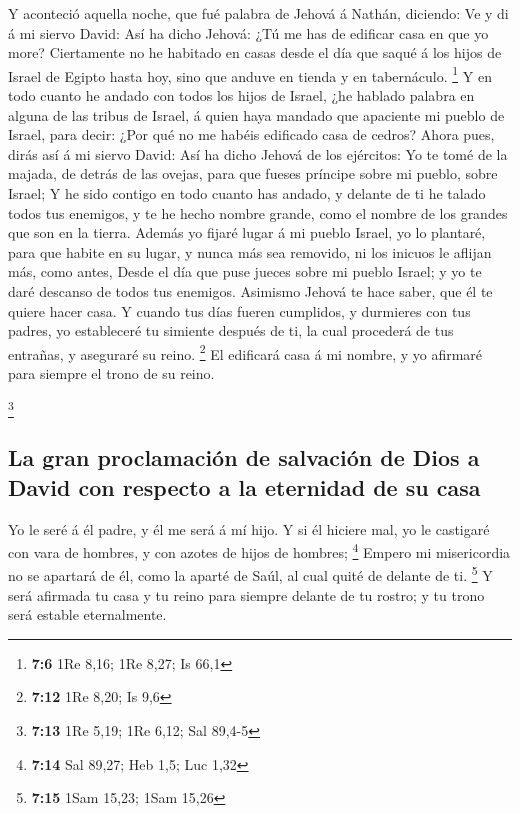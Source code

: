  Y aconteció aquella noche, que fué palabra de Jehová á
Nathán, diciendo:  Ve y di á mi siervo David: Así ha dicho
Jehová: ¿Tú me has de edificar casa en que yo more? 
Ciertamente no he habitado en casas desde el día que saqué á los hijos
de Israel de Egipto hasta hoy, sino que anduve en tienda y en
tabernáculo. \footnote{\textbf{7:6} 1Re 8,16; 1Re 8,27; Is 66,1}
 Y en todo cuanto he andado con todos los hijos de Israel,
¿he hablado palabra en alguna de las tribus de Israel, á quien haya
mandado que apaciente mi pueblo de Israel, para decir: ¿Por qué no me
habéis edificado casa de cedros?  Ahora pues, dirás así á mi
siervo David: Así ha dicho Jehová de los ejércitos: Yo te tomé de la
majada, de detrás de las ovejas, para que fueses príncipe sobre mi
pueblo, sobre Israel;  Y he sido contigo en todo cuanto has
andado, y delante de ti he talado todos tus enemigos, y te he hecho
nombre grande, como el nombre de los grandes que son en la tierra.
 Además yo fijaré lugar á mi pueblo Israel, yo lo plantaré,
para que habite en su lugar, y nunca más sea removido, ni los inicuos le
aflijan más, como antes,  Desde el día que puse jueces
sobre mi pueblo Israel; y yo te daré descanso de todos tus enemigos.
Asimismo Jehová te hace saber, que él te quiere hacer casa.
 Y cuando tus días fueren cumplidos, y durmieres con tus
padres, yo estableceré tu simiente después de ti, la cual procederá de
tus entrañas, y aseguraré su reino. \footnote{\textbf{7:12} 1Re 8,20; Is
  9,6}  El edificará casa á mi nombre, y yo afirmaré para
siempre el trono de su reino.

\footnote{\textbf{7:13} 1Re 5,19; 1Re 6,12; Sal 89,4-5}

\hypertarget{la-gran-proclamaciuxf3n-de-salvaciuxf3n-de-dios-a-david-con-respecto-a-la-eternidad-de-su-casa}{%
\subsection{La gran proclamación de salvación de Dios a David con
respecto a la eternidad de su
casa}\label{la-gran-proclamaciuxf3n-de-salvaciuxf3n-de-dios-a-david-con-respecto-a-la-eternidad-de-su-casa}}

 Yo le seré á él padre, y él me será á mí hijo. Y si él
hiciere mal, yo le castigaré con vara de hombres, y con azotes de hijos
de hombres; \footnote{\textbf{7:14} Sal 89,27; Heb 1,5; Luc 1,32}
 Empero mi misericordia no se apartará de él, como la
aparté de Saúl, al cual quité de delante de ti. \footnote{\textbf{7:15}
  1Sam 15,23; 1Sam 15,26}  Y será afirmada tu casa y tu
reino para siempre delante de tu rostro; y tu trono será estable
eternalmente.

